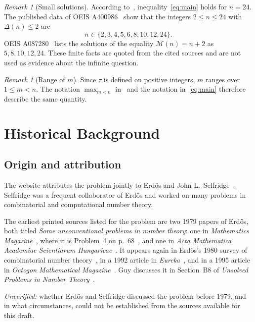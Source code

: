 \documentclass[11pt]{amsart}
\theoremstyle{plain}
\theoremstyle{definition}
\theoremstyle{remark}
\newtheorem{remark}[theorem]{Remark}
\numberwithin{equation}{section}
\newcommand{\Mx}{\mathcal{M}}   %
\newcommand{\Dl}{\Delta}        %
\begin{document}
\begin{remark}[Small solutions]\label{rem:small}
According to~\cite{Bloom647}, inequality~\eqref{eq:main} holds for $n=24$. The published data of OEIS A400986~\cite{OEIS_A400986} show that the integers $2\le n\le 24$ with $\Dl(n)\le 2$ are
\[
  n\in\{2,3,4,5,6,8,10,12,24\}.
\]
OEIS A087280~\cite{OEIS_A087280} lists the solutions of the equality $\Mx(n)=n+2$ as $5,8,10,12,24$. These finite facts are quoted from the cited sources and are not used as evidence about the infinite question.
\end{remark}

\begin{remark}[Range of $m$]
Since $\tau$ is defined on positive integers, $m$ ranges over $1\le m<n$. The notation $\max_{m<n}$ in~\cite{Bloom647} and the notation in~\eqref{eq:main} therefore describe the same quantity.
\end{remark}

\section{Historical Background}\label{sec:history}

\subsection{Origin and attribution}
The website attributes the problem jointly to Erd\H{o}s and John L.~Selfridge~\cite{Bloom647}. Selfridge was a frequent collaborator of Erd\H{o}s and worked on many problems in combinatorial and computational number theory.

The earliest printed sources listed for the problem are two 1979 papers of Erd\H{o}s, both titled \emph{Some unconventional problems in number theory}: one in \emph{Mathematics Magazine}~\cite{Erdos1979MathMag}, where it is Problem~4 on p.~68~\cite{OEIS_A087280}, and one in \emph{Acta Mathematica Academiae Scientiarum Hungaricae}~\cite{Erdos1979Acta}. It appears again in Erd\H{o}s's 1980 survey of combinatorial number theory~\cite[p.~107]{Erdos1980Survey}, in a 1992 article in \emph{Eureka}~\cite{Erdos1992Eureka}, and in a 1995 article in \emph{Octogon Mathematical Magazine}~\cite{Erdos1995Octogon}. Guy discusses it in Section~B8 of \emph{Unsolved Problems in Number Theory}~\cite{Guy2004}.

\emph{Unverified:} whether Erd\H{o}s and Selfridge discussed the problem before 1979, and in what circumstances, could not be established from the sources available for this draft.
\end{document}
